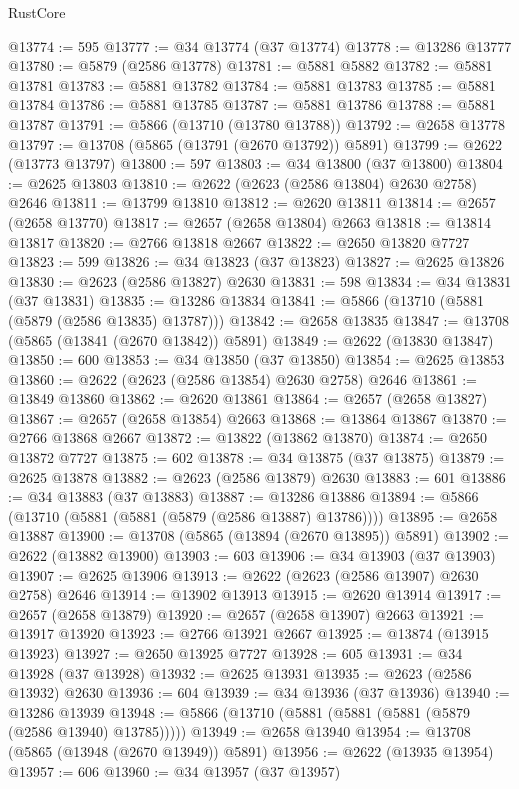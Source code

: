 \begin{lexlean}{RustCore}
\begin{coremodule}
@13774 := 595
@13777 := @34 @13774 (@37 @13774)
@13778 := @13286 @13777
@13780 := @5879 (@2586 @13778)
@13781 := @5881 @5882
@13782 := @5881 @13781
@13783 := @5881 @13782
@13784 := @5881 @13783
@13785 := @5881 @13784
@13786 := @5881 @13785
@13787 := @5881 @13786
@13788 := @5881 @13787
@13791 := @5866 (@13710 (@13780 @13788))
@13792 := @2658 @13778
@13797 := @13708 (@5865 (@13791 (@2670 @13792)) @5891)
@13799 := @2622 (@13773 @13797)
@13800 := 597
@13803 := @34 @13800 (@37 @13800)
@13804 := @2625 @13803
@13810 := @2622 (@2623 (@2586 @13804) @2630 @2758) @2646
@13811 := @13799 @13810
@13812 := @2620 @13811
@13814 := @2657 (@2658 @13770)
@13817 := @2657 (@2658 @13804) @2663
@13818 := @13814 @13817
@13820 := @2766 @13818 @2667
@13822 := @2650 @13820 @7727
@13823 := 599
@13826 := @34 @13823 (@37 @13823)
@13827 := @2625 @13826
@13830 := @2623 (@2586 @13827) @2630
@13831 := 598
@13834 := @34 @13831 (@37 @13831)
@13835 := @13286 @13834
@13841 := @5866 (@13710 (@5881 (@5879 (@2586 @13835) @13787)))
@13842 := @2658 @13835
@13847 := @13708 (@5865 (@13841 (@2670 @13842)) @5891)
@13849 := @2622 (@13830 @13847)
@13850 := 600
@13853 := @34 @13850 (@37 @13850)
@13854 := @2625 @13853
@13860 := @2622 (@2623 (@2586 @13854) @2630 @2758) @2646
@13861 := @13849 @13860
@13862 := @2620 @13861
@13864 := @2657 (@2658 @13827)
@13867 := @2657 (@2658 @13854) @2663
@13868 := @13864 @13867
@13870 := @2766 @13868 @2667
@13872 := @13822 (@13862 @13870)
@13874 := @2650 @13872 @7727
@13875 := 602
@13878 := @34 @13875 (@37 @13875)
@13879 := @2625 @13878
@13882 := @2623 (@2586 @13879) @2630
@13883 := 601
@13886 := @34 @13883 (@37 @13883)
@13887 := @13286 @13886
@13894 := @5866 (@13710 (@5881 (@5881 (@5879 (@2586 @13887) @13786))))
@13895 := @2658 @13887
@13900 := @13708 (@5865 (@13894 (@2670 @13895)) @5891)
@13902 := @2622 (@13882 @13900)
@13903 := 603
@13906 := @34 @13903 (@37 @13903)
@13907 := @2625 @13906
@13913 := @2622 (@2623 (@2586 @13907) @2630 @2758) @2646
@13914 := @13902 @13913
@13915 := @2620 @13914
@13917 := @2657 (@2658 @13879)
@13920 := @2657 (@2658 @13907) @2663
@13921 := @13917 @13920
@13923 := @2766 @13921 @2667
@13925 := @13874 (@13915 @13923)
@13927 := @2650 @13925 @7727
@13928 := 605
@13931 := @34 @13928 (@37 @13928)
@13932 := @2625 @13931
@13935 := @2623 (@2586 @13932) @2630
@13936 := 604
@13939 := @34 @13936 (@37 @13936)
@13940 := @13286 @13939
@13948 := @5866 (@13710 (@5881 (@5881 (@5881 (@5879 (@2586 @13940) @13785)))))
@13949 := @2658 @13940
@13954 := @13708 (@5865 (@13948 (@2670 @13949)) @5891)
@13956 := @2622 (@13935 @13954)
@13957 := 606
@13960 := @34 @13957 (@37 @13957)

\end{coremodule}
\end{lexlean}
